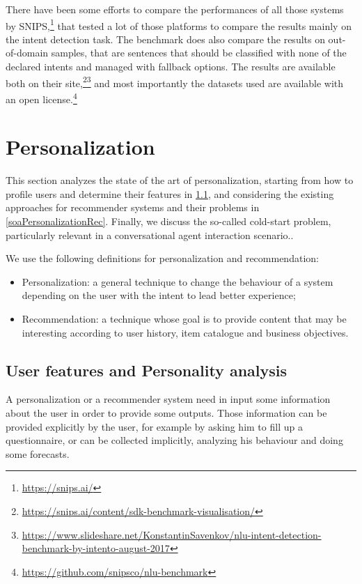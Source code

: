 There have been some efforts to compare the performances of all those systems by SNIPS,\footnote{\url{https://snips.ai/}} that tested a lot of those platforms to compare the results mainly on the intent detection task. The benchmark does also compare the results on out-of-domain samples, that are sentences that should be classified with none of the declared intents and managed with fallback options. The results are available both on their site,\footnote{\url{https://snips.ai/content/sdk-benchmark-visualisation/}}\footnote{\url{https://www.slideshare.net/KonstantinSavenkov/nlu-intent-detection-benchmark-by-intento-august-2017}} and most importantly the datasets used are available with an open license.\footnote{\url{https://github.com/snipsco/nlu-benchmark}}


\section{Personalization}
\label{soaPersonalization}

This section analyzes the state of the art of personalization, starting from how to profile users and determine their features in \ref{soaPersonalizationFeatures}, and considering the existing approaches for recommender systems and their problems in \ref{soaPersonalizationRec}. Finally, we discuss the so-called cold-start problem, particularly relevant in a conversational agent interaction scenario..

We use the following definitions for personalization and recommendation:

\begin{itemize}
	\item Personalization: a general technique to change the behaviour of a system depending on the user with the intent to lead better experience;

	\item Recommendation: a technique whose goal is to provide content that may be interesting according to user history, item catalogue and business objectives.
\end{itemize}

\subsection{User features and Personality analysis}
\label{soaPersonalizationFeatures}

A personalization or a recommender system need in input some information about the user in order to provide some outputs. Those information can be provided explicitly by the user, for example by asking him to fill up a questionnaire, or can be collected implicitly, analyzing his behaviour and doing some forecasts.

